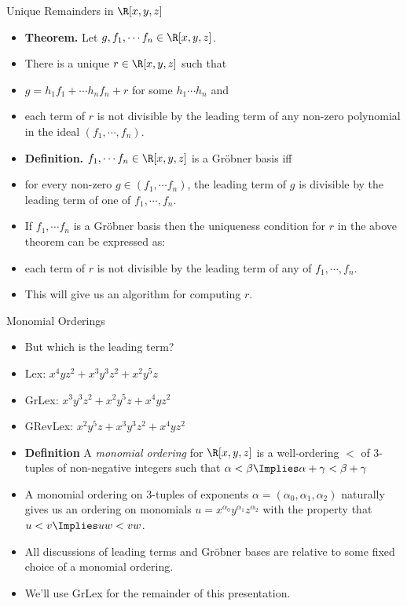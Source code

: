 \documentclass[handout]{beamer}
\begin{document}
\begin{frame}{Unique Remainders in $\R[x,y,z]$}

\begin{itemize}
  \item \textbf{Theorem.} Let $g, f_1,\cdots f_n \in \R[x,y,z]$.
  \item There is a unique $r\in\R[x,y,z]$ such that
  \item $g = h_1 f_1 + \cdots h_n f_n + r$ for some $h_1\cdots h_n$ and
  \item each term of $r$ is not divisible by the leading term of any non-zero polynomial in the ideal $(f_1,\cdots,f_n)$.
  \item \textbf{Definition.} $f_1,\cdots f_n \in \R[x,y,z]$ is a Gr\"{o}bner basis iff
  \item for every non-zero $g\in (f_1,\cdots f_n)$, the leading term of $g$ is divisible
  by the leading term of one of $f_1,\cdots,f_n$.
  \item If $f_1,\cdots f_n$ is a Gr\"{o}bner basis then the uniqueness condition for $r$ in the above theorem can be expressed as:
  \item each term of $r$ is not divisible by the leading term of any of $f_1,\cdots,f_n$.
  \item This will give us an algorithm for computing $r$.
\end{itemize}

\end{frame}


\begin{frame}{Monomial Orderings}

\begin{itemize}
  \item But which is the leading term?
  \item Lex: $x^4yz^2 + x^3y^3z^2 + x^2y^5z$
  \item GrLex: $x^3y^3z^2 + x^2y^5z + x^4yz^2$
  \item GRevLex: $x^2y^5z +x^3y^3z^2 +  x^4yz^2$
  \item \textbf{Definition} A \emph{monomial ordering} for $\R[x,y,z]$ is a
  well-ordering $<$ of 3-tuples of non-negative integers such that $\alpha < \beta \Implies \alpha + \gamma < \beta + \gamma$
  \item A monomial ordering on 3-tuples of exponents $\alpha=(\alpha_0,\alpha_1,\alpha_2)$ naturally gives us an ordering on
  monomials $u = x^{\alpha_0}y^{\alpha_1}z^{\alpha_2}$ with the property that $u<v \Implies uw < vw$.
  \item All discussions of leading terms and Gr\"{o}bner bases are relative to some fixed choice of a monomial ordering.
  \item We'll use GrLex for the remainder of this presentation.
\end{itemize}

\end{frame}
\end{document}
